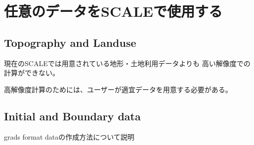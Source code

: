 \section{任意のデータをSCALEで使用する}

\subsection{Topography and Landuse}

現在のSCALEでは用意されている地形・土地利用データよりも
高い解像度での計算ができない。

高解像度計算のためには、ユーザーが適宜データを用意する必要がある。


\subsection{Initial and Boundary data}
\label{sec:adv_bnddata}

grads format dataの作成方法について説明
